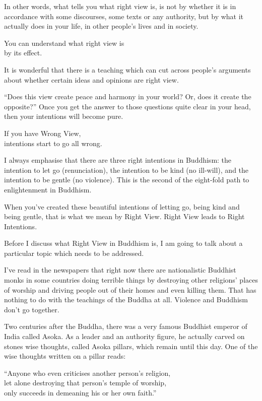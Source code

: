 \documentclass[12pt, openany]{book}
\newenvironment{aphorism}%
{%
\begin{center}\begin{itshape}
}%
{\end{itshape}\end{center}
}%
\begin{document}
In other words, what tells you what right view is, is not by whether it is in accordance with some discourses, some texts or any authority, but by what it actually does in your life, in other people’s lives and in society. 

\begin{aphorism}
You can understand what right view is\\  
by its effect.
\end{aphorism}

It is wonderful that there is a teaching which can cut across people’s arguments about whether certain ideas and opinions are right view. 

“Does this view create peace and harmony in your world? Or, does it create the opposite?” Once you get the answer to those questions quite clear in your head, then your intentions will become pure. 

\begin{aphorism}
If you have Wrong View,\\ 
intentions start to go all wrong.
\end{aphorism}

I always emphasise that there are three right intentions in Buddhism: the intention to let go (renunciation), the intention to be kind (no ill-will), and the intention to be gentle (no violence). This is the second of the eight-fold path to enlightenment in Buddhism. 

When you’ve created these beautiful intentions of letting go, being kind and being gentle, that is what we mean by Right View. Right View leads to Right Intentions. 

Before I discuss what Right View in Buddhism is, I am going to talk about a particular topic which needs to be addressed. 

I’ve read in the newspapers that right now there are nationalistic Buddhist monks in some countries doing terrible things by destroying other religions’ places of worship and driving people out of their homes and even killing them. That has nothing to do with the teachings of the Buddha at all. Violence and Buddhism don’t go together. 

Two centuries after the Buddha, there was a very famous Buddhist emperor of India called Asoka. As a leader and an authority figure, he actually carved on stones wise thoughts, called Asoka pillars, which remain until this day. One of the wise thoughts written on a pillar reads: 

\begin{aphorism}
“Anyone who even criticises another person’s religion,\\  
let alone destroying that person’s temple of worship,\\ 
only succeeds in demeaning his or her own faith.”
\end{aphorism}
\end{document}
